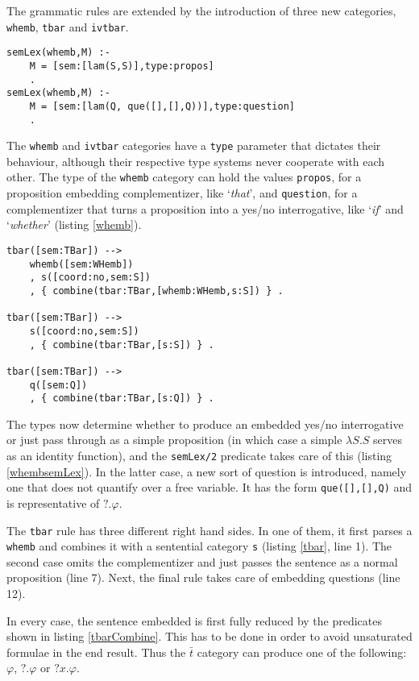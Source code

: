 \documentclass[notitlepage,twoside,a4paper]{scrreprt}
\newcommand{\code}[1]{\texttt{#1}} %
\newcommand{\example}[1]{`\textit{#1}'} %
\theoremstyle{remark}
\theoremstyle{remark}
\theoremstyle{definition}
\theoremstyle{definition}
\begin{document}
The grammatic rules are extended by the introduction of three new categories,
\code{whemb}, \code{tbar} and \code{ivtbar}.

\begin{lstlisting}[label=whembsemLex,caption={Semantic Rules for Complementizers},float]
semLex(whemb,M) :-
    M = [sem:[lam(S,S)],type:propos]
    .
semLex(whemb,M) :-
    M = [sem:[lam(Q, que([],[],Q))],type:question]
    .
\end{lstlisting}

The \code{whemb} and \code{ivtbar} categories have a \code{type} parameter that dictates
their behaviour, although their respective type systems never cooperate with
each other. The type of the \code{whemb} category can hold the values
\code{propos}, for a proposition embedding complementizer, like \example{that},
and \code{question}, for a complementizer that turns a proposition into a yes/no
interrogative, like \example{if} and \example{whether} (listing \ref{whemb}).

\begin{lstlisting}[label=tbar,caption={Semantic Rules for $\bar{t}$},float]
tbar([sem:TBar]) -->
    whemb([sem:WHemb])
    , s([coord:no,sem:S])
    , { combine(tbar:TBar,[whemb:WHemb,s:S]) } .

tbar([sem:TBar]) -->
    s([coord:no,sem:S])
    , { combine(tbar:TBar,[s:S]) } .
 
tbar([sem:TBar]) -->
    q([sem:Q])
    , { combine(tbar:TBar,[s:Q]) } .
\end{lstlisting}

The types now determine whether to produce an embedded yes/no
interrogative or just pass through as a simple proposition (in which case a
simple $\lambda S. S$ serves as an identity function), and the
\code{semLex/2} predicate takes care of this (listing \ref{whembsemLex}). In the
latter case, a new sort of question is introduced, namely one that does not
quantify over a free variable. It has the form \lstinline!que([],[],Q)! and is
representative of $?.\varphi$.

The \code{tbar} rule has three different right hand sides. 
In one of them, it first parses a \code{whemb} and combines it with a sentential
category \code{s} (listing \ref{tbar}, line 1). The second case omits the
complementizer and just passes the sentence as a normal proposition (line 7).
Next, the final rule takes care of embedding questions (line 12).

In every case, the sentence embedded is first fully reduced by the predicates
shown in listing \ref{tbarCombine}. This has to be done in order to avoid
unsaturated formulae in the end result. Thus the $\bar{t}$ category can   produce
one of the following: $\varphi$, $?.\varphi$ or $?x.\varphi$.
\end{document}
